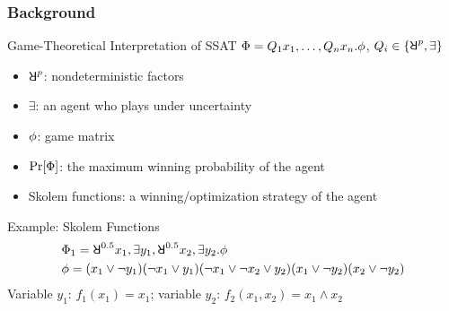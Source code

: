\begin{frame}
\begin{figure}
  \end{figure}
\end{frame}

\begin{frame}
  \frametitle{Background}
  \begin{block}{Game-Theoretical Interpretation of SSAT}
    $\Phi=Q_1 x_1,\ldots,Q_n x_n.\phi$, $Q_i \in \{\random{p},\exists\}$
    \pause
    \begin{itemize}
      \item $\random{p}$: nondeterministic factors
            \pause
      \item $\exists$: an agent who plays under uncertainty
            \pause
      \item $\phi$: game matrix
            \pause
      \item $\Pr[\Phi]$: the maximum winning probability of the agent
            \pause
      \item \alert{Skolem functions}: a winning/optimization strategy of the agent
    \end{itemize}
  \end{block}\pause
  \begin{block}{Example: Skolem Functions}
    \abovedisplayskip=0pt
    \begin{align*}
       & \Qf_1=\random{0.5} x_1, \exists y_1, \random{0.5} x_2, \exists y_2. \pf \\
       & \pf=(x_1 \lor \lnot y_1)
      (\lnot x_1 \lor y_1)
      (\lnot x_1 \lor \lnot x_2 \lor y_2)
      (x_1 \lor \lnot y_2)
      (x_2 \lor \lnot y_2)
    \end{align*}
    \pause
    Variable $y_1$: $f_1(x_1)=x_1$;
    variable $y_2$: $f_2(x_1,x_2)=x_1 \land x_2$
  \end{block}
\end{frame}

